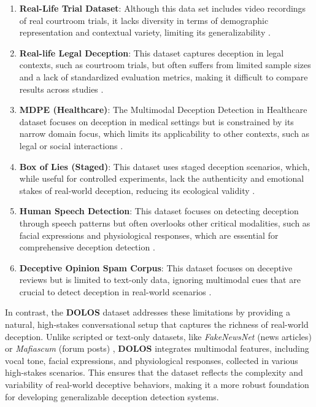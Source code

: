 \documentclass{article} %
\begin{document}
\begin{enumerate}
\item \textbf{Real-Life Trial Dataset}: Although this data set includes video recordings of real courtroom trials, it lacks diversity in terms of demographic representation and contextual variety, limiting its generalizability \citep{fornaciari2014identifying}.

\item \textbf{Real-life Legal Deception}: This dataset captures deception in legal contexts, such as courtroom trials, but often suffers from limited sample sizes and a lack of standardized evaluation metrics, making it difficult to compare results across studies \citep{perez2015deception}.

\item \textbf{MDPE (Healthcare)}: The Multimodal Deception Detection in Healthcare dataset focuses on deception in medical settings but is constrained by its narrow domain focus, which limits its applicability to other contexts, such as legal or social interactions \citep{cai2024mdpemultimodaldeceptiondataset}.

\item \textbf{Box of Lies (Staged)}: This dataset uses staged deception scenarios, which, while useful for controlled experiments, lack the authenticity and emotional stakes of real-world deception, reducing its ecological validity \citep{Benus2016}.

\item \textbf{Human Speech Detection}: This dataset focuses on detecting deception through speech patterns but often overlooks other critical modalities, such as facial expressions and physiological responses, which are essential for comprehensive deception detection \citep{Benus2016speech}.

\item \textbf{Deceptive Opinion Spam Corpus}: This dataset focuses on deceptive reviews but is limited to text-only data, ignoring multimodal cues that are crucial to detect deception in real-world scenarios \citep{ott2011findingdeceptive}.
\end{enumerate}

In contrast, the \textbf{DOLOS} dataset \citep{guo2023audiovisualdeceptiondetectiondolos} addresses these limitations by providing a natural, high-stakes conversational setup that captures the richness of real-world deception. Unlike scripted or text-only datasets, like \textit{FakeNewsNet} (news articles) \citep{shu2019fakenewsnet} or \textit{Mafiascum} (forum posts) \citep{deruiter2019mafiascumdatasetlargetext}, \textbf{DOLOS} integrates multimodal features, including vocal tone, facial expressions, and physiological responses, collected in various high-stakes scenarios. This ensures that the dataset reflects the complexity and variability of real-world deceptive behaviors, making it a more robust foundation for developing generalizable deception detection systems.
\end{document}
